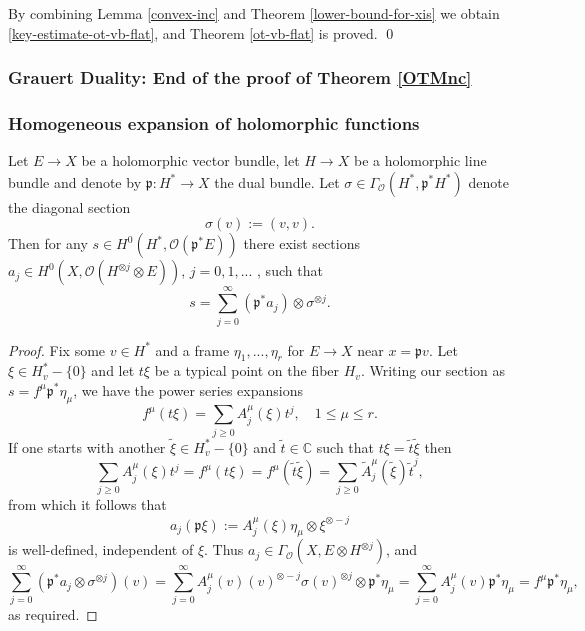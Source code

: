 \documentclass[12pt,hidelinks]{amsart}
\newcommand{\cO}{{\mathcal O}}
\newcommand{\fp}{{\mathfrak p}}
\newcommand{\bbC}{{\mathbb C}}
\newcommand{\tensor}{\otimes}
\begin{document}
By combining Lemma \ref{convex-inc} and Theorem \ref{lower-bound-for-xis} we obtain \eqref{key-estimate-ot-vb-flat}, and Theorem \ref{ot-vb-flat} is proved.
\qed

\subsubsection{\sc Grauert Duality:  End of the proof of Theorem \ref{OTMnc}}


\subsubsection*{\bf Homogeneous expansion of holomorphic functions}

\begin{prop}\label{homog-expansion}
Let $E \to X$ be a holomorphic vector bundle, let $H \to X$ be a holomorphic line bundle and denote by $\fp :H^* \to X$ the dual bundle.  Let $\sigma \in \Gamma _{\cO} (H^*, \fp ^*H^*)$ denote the diagonal section 
\[
\sigma (v) := (v,v).
\]
Then for any $s \in H^0(H^*, \cO (\fp ^* E))$ there exist sections $a_j \in H^0 (X, \cO(H^{\tensor j}\tensor E))$, $j=0,1,...$ ,  such that 
\[
s = \sum _{j=0} ^{\infty} (\fp ^* a_j)\tensor \sigma ^{\tensor j}.
\]
\end{prop}

\begin{proof}
Fix some $v \in H^*$ and a frame $\eta_1,...,\eta _r$ for $E \to X$ near $x = \fp v$.  Let $\xi \in H^*_v- \{0\}$ and let $t \xi$ be a typical point on the fiber $H_v$.  Writing our section as $s = f^{\mu} \fp ^* \eta_{\mu}$, we have the power series expansions 
\[
f^{\mu}(t\xi) = \sum _{j \ge 0} A^{\mu}_j(\xi) t^j, \quad 1 \le \mu \le r.
\]
If one starts with another $\tilde \xi \in H^*_v- \{0\}$ and $\tilde t \in \bbC$ such that $t \xi = \tilde t \tilde \xi$ then  
\[
\sum _{j \ge 0} A^{\mu}_j(\xi) t^j = f^{\mu}(t\xi) = f^{\mu}(\tilde t \tilde \xi) =  \sum _{j \ge 0} \tilde A^{\mu}_j(\tilde \xi) \tilde t^{j},
\]
from which it follows that 
\[
a_j(\fp \xi) := A^{\mu}_j(\xi) \eta _{\mu}\tensor \xi ^{\tensor - j}
\]
is well-defined, independent of $\xi$.  Thus $a_j \in \Gamma _{\cO} (X, E\tensor H^{\tensor j})$, and 
\[
\sum _{j=0} ^{\infty} \left ( \fp ^*a _j \tensor \sigma ^{\tensor j} \right ) (v) = \sum _{j=0} ^{\infty} A^{\mu}_j(v) (v)^{\tensor -j} \sigma (v)^{\tensor j} \tensor \fp ^* \eta_{\mu} = \sum _{j=0} ^{\infty} A^{\mu}_j(v)  \fp ^* \eta_{\mu} = f ^{\mu}\fp ^* \eta_{\mu},
\]
as required.
\end{proof}
\end{document}
